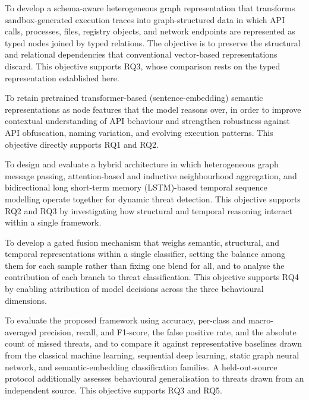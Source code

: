 \documentclass[%
    BCOR=10mm,
    DIV=13,
    toc=bibliography,
    toc=listof,
    oneside,
    12pt,
]{scrbook}
\begin{document}
\begin{description}[leftmargin=0pt, labelwidth=0pt, labelsep=\parskip, style=nextline]

\item[\textbf{Objective 1 -- Schema-aware heterogeneous representation.}] To
develop a schema-aware heterogeneous graph representation that transforms
sandbox-generated execution traces into graph-structured data in which API
calls, processes, files, registry objects, and network endpoints are
represented as typed nodes joined by typed relations. The objective is to
preserve the structural and relational dependencies that conventional
vector-based representations discard. This objective supports RQ3, whose
comparison rests on the typed representation established here.

\item[\textbf{Objective 2 -- Semantic enrichment for behavioural generalisation.}]
To retain pretrained transformer-based (sentence-embedding) semantic
representations as node features that the model reasons over, in order to
improve contextual understanding of API behaviour and strengthen robustness
against API obfuscation, naming variation, and evolving execution patterns. This objective directly supports RQ1 and RQ2.

\item[\textbf{Objective 3 -- Hybrid heterogeneous-temporal architecture.}]
To design and evaluate a hybrid architecture in which heterogeneous
graph message passing, attention-based and inductive neighbourhood aggregation,
and bidirectional long short-term memory (LSTM)-based temporal sequence modelling
operate together for dynamic threat detection. This objective supports RQ2 and RQ3 by investigating how structural
and temporal reasoning interact within a single framework.

\item[\textbf{Objective 4 -- Adaptive fusion and attribution.}]
To develop a gated fusion mechanism that weighs semantic, structural, and
temporal representations within a single classifier, setting the balance among
them for each sample rather than fixing one blend for all, and to analyse the
contribution of each branch to threat classification. This objective supports RQ4 by enabling attribution of model
decisions across the three behavioural dimensions.

\item[\textbf{Objective 5 -- Evaluation and cross-source generalisation.}]
To evaluate the proposed framework using accuracy, per-class and
macro-averaged precision, recall, and F1-score, the false positive rate, and
the absolute count of missed threats, and to compare it against representative
baselines drawn from the classical machine learning, sequential deep learning,
static graph neural network, and semantic-embedding classification families. A
held-out-source protocol additionally assesses behavioural generalisation to
threats drawn from an independent source. This objective supports RQ3 and RQ5.

\end{description}
\end{document}
